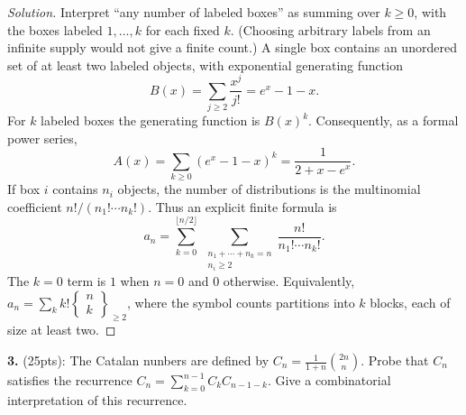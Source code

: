 \documentclass[12pt]{amsart}
\newenvironment{solution}
{\begin{proof}[Solution]}
{\end{proof}}
\begin{document}
\begin{onehalfspace}
        \begin{solution}
            Interpret ``any number of labeled boxes'' as summing over
            $k\ge0$, with the boxes labeled $1,\ldots,k$ for each fixed $k$.
            (Choosing arbitrary labels from an infinite supply would not give
            a finite count.)  A single box contains an unordered set of at
            least two labeled objects, with exponential generating function
            \[
                B(x)=\sum_{j\ge2}\frac{x^j}{j!}=e^x-1-x.
            \]
            For $k$ labeled boxes the generating function is $B(x)^k$.
            Consequently, as a formal power series,
            \[
                A(x)=\sum_{k\ge0}(e^x-1-x)^k
                    =\frac{1}{2+x-e^x}.
            \]
            If box $i$ contains $n_i$ objects, the number of distributions is
            the multinomial coefficient $n!/(n_1!\cdots n_k!)$.  Thus an
            explicit finite formula is
            \[
                a_n=\sum_{k=0}^{\lfloor n/2\rfloor}
                \ \sum_{\substack{n_1+\cdots+n_k=n\\n_i\ge2}}
                \frac{n!}{n_1!\cdots n_k!}.
            \]
            The $k=0$ term is $1$ when $n=0$ and $0$ otherwise.
            Equivalently, $a_n=\sum_k k!\left\{\begin{smallmatrix}n\\k
            \end{smallmatrix}\right\}_{\ge2}$, where the symbol counts
            partitions into $k$ blocks, each of size at least two.
        \end{solution}

        \noindent\textbf{3.} (25pts): The Catalan nunbers are defined by $C_n =
        \frac{1}{1+n}\binom{2n}{n}$.
        Probe that $C_n$ satisfies the recurrence $C_n=\sum_{k=0}^{n-1}C_k C_{n-1-k}$.
        Give a combinatorial interpretation of this recurrence.


\end{onehalfspace}
\end{document}
